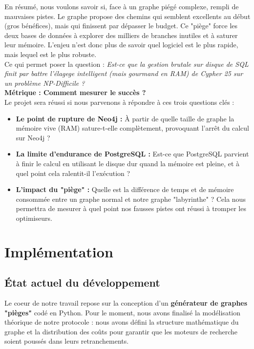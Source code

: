 \documentclass{article}
\begin{document}
    En résumé, nous voulons savoir si, face à un graphe piégé complexe, rempli de mauvaises pistes. Le graphe propose des chemins qui semblent excellents au début (gros bénéfices), mais qui finissent par dépasser le budget. Ce "piège" force les deux bases de données à explorer des milliers de branches inutiles et à saturer leur mémoire. L'enjeu n'est donc plus de savoir quel logiciel est le plus rapide, mais lequel est le plus robuste. \\
    Ce qui permet poser la question : \textit{Est-ce que la gestion brutale sur disque de SQL finit par battre l'élagege intelligent (mais gourmand en RAM) de Cypher 25 sur un problème NP-Difficile ?} \\


    \textbf{Métrique : Comment mesurer le succès ?} \\
    Le projet sera réussi si nous parvenons à répondre à ces trois questions clés :

    \begin{itemize}
        \item \textbf{Le point de rupture de Neo4j :} À partir de quelle taille de graphe la mémoire vive (RAM) sature-t-elle complètement, provoquant l'arrêt du calcul sur Neo4j ?
        \item \textbf{La limite d'endurance de PostgreSQL :} Est-ce que PostgreSQL parvient à finir le calcul en utilisant le disque dur quand la mémoire est pleine, et à quel point cela ralentit-il l'exécution ?
        \item \textbf{L'impact du "piège" :} Quelle est la différence de temps et de mémoire consommée entre un graphe normal et notre graphe "labyrinthe" ? Cela nous permettra de mesurer à quel point nos fausses pistes ont réussi à tromper les optimiseurs.
    \end{itemize}

    \section{Implémentation}

    \subsection{État actuel du développement}
    Le coeur de notre travail repose sur la conception d'un \textbf{générateur de graphes "pièges"} codé en Python. Pour le moment, nous avons finalisé la modélisation théorique de notre protocole : nous avons défini la structure mathématique du graphe et la distribution des coûts pour garantir que les moteurs de recherche soient poussés dans leurs retranchements. \\
\end{document}
